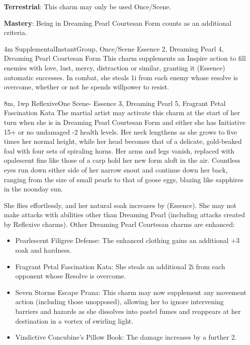 \textbf{Terrestrial}: This charm may only be used Once/Scene.

\textbf{Mastery}: Being in Dreaming Pearl Courtesan Form counts as an additional criteria.

{4m}
{Supplemental}{Instant}{Group, Once/Scene}
{Essence 2, Dreaming Pearl 4, Dreaming Pearl Courtesan Form}
This charm supplements an Inspire action to fill enemies with love, lust, mercy, distraction or similar, granting it (Essence) automatic successes. In combat, she steals 1i from each enemy whose resolve is overcome, whether or not he spends willpower to resist.

{8m, 1wp}
{Reflexive}{One Scene}{-}
{Essence 3, Dreaming Pearl 5, Fragrant Petal Fascination Kata}
The martial artist may activate this charm at the start of her turn when she is in Dreaming Pearl Courtesan Form and either she has Initiative 15+ or no undamaged -2 health levels. Her neck lengthens as she grows to five times her normal height, while her head becomes that of a delicate, gold-beaked foal with four sets of spiraling horns. Her arms and legs vanish, replaced with opalescent fins like those of a carp hold her new form aloft in the air. Countless eyes run down either side of her narrow snout and continue down her back, ranging from the size of small pearls to that of goose eggs, blazing like sapphires in the noonday sun.

She flies effortlessly, and her natural soak increases by (Essence). She may not make attacks with abilities other than Dreaming Pearl (including attacks created by Reflexive charms). Other Dreaming Pearl Courtesan charms are enhanced:

\begin{itemize}
  \item Pearlescent Filigree Defense: The enhanced clothing gains an additional +3 soak and hardness.
  \item Fragrant Petal Fascination Kata: She steals an additional 2i from each opponent whose Resolve is overcome.
  \item Seven Storms Escape Prana: This charm may now supplement any movement action (including those unopposed), allowing her to ignore intervening barriers and hazards as she dissolves into pastel fumes and reappears at her destination in a vortex of swirling light.
  \item Vindictive Concubine's Pillow Book: The damage increases by a further 2.
\end{itemize}

